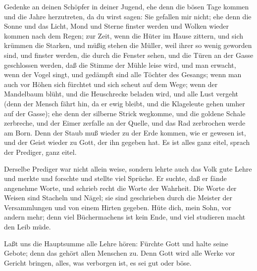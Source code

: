  Gedenke an deinen Schöpfer in deiner Jugend, ehe denn die
bösen Tage kommen und die Jahre herzutreten, da du wirst sagen: Sie
gefallen mir nicht;  ehe denn die Sonne und das Licht, Mond
und Sterne finster werden und Wolken wieder kommen nach dem Regen;
 zur Zeit, wenn die Hüter im Hause zittern, und sich krümmen
die Starken, und müßig stehen die Müller, weil ihrer so wenig geworden
sind, und finster werden, die durch die Fenster sehen,  und
die Türen an der Gasse geschlossen werden, daß die Stimme der Mühle
leise wird, und man erwacht, wenn der Vogel singt, und gedämpft sind
alle Töchter des Gesangs;  wenn man auch vor Höhen sich
fürchtet und sich scheut auf dem Wege; wenn der Mandelbaum blüht, und
die Heuschrecke beladen wird, und alle Lust vergeht (denn der Mensch
fährt hin, da er ewig bleibt, und die Klageleute gehen umher auf der
Gasse);  ehe denn der silberne Strick wegkomme, und die
goldene Schale zerbreche, und der Eimer zerfalle an der Quelle, und das
Rad zerbrochen werde am Born.  Denn der Staub muß wieder zu
der Erde kommen, wie er gewesen ist, und der Geist wieder zu Gott, der
ihn gegeben hat.  Es ist alles ganz eitel, sprach der
Prediger, ganz eitel.

 Derselbe Prediger war nicht allein weise, sondern lehrte
auch das Volk gute Lehre und merkte und forschte und stellte viel
Sprüche.  Er suchte, daß er fände angenehme Worte, und
schrieb recht die Worte der Wahrheit.  Die Worte der Weisen
sind Stacheln und Nägel; sie sind geschrieben durch die Meister der
Versammlungen und von einem Hirten gegeben.  Hüte dich,
mein Sohn, vor andern mehr; denn viel Büchermachens ist kein Ende, und
viel studieren macht den Leib müde.

 Laßt uns die Hauptsumme alle Lehre hören: Fürchte Gott und
halte seine Gebote; denn das gehört allen Menschen zu. 
Denn Gott wird alle Werke vor Gericht bringen, alles, was verborgen ist,
es sei gut oder böse.
